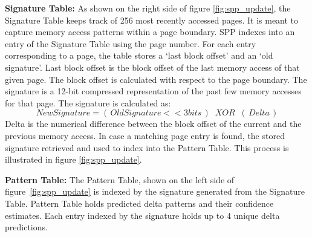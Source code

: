 \noindent \textbf{Signature Table:} As shown on the right side of
figure \ref{fig:spp_update}, the Signature Table keeps track of 256
most recently accessed pages. It is meant to capture memory access
patterns within a page boundary. SPP indexes into an entry of the
Signature Table using the page number. For each entry corresponding to
a page, the table stores a `last block offset' and an `old
signature'. Last block offset is the block offset of the last memory
access of that given page. The block offset is calculated with respect
to the page boundary. The signature is a 12-bit compressed
representation of the past few memory accesses for that page. The
signature is calculated as:
$$New Signature = (\,Old Signature << 3 bits\,) \;\;XOR\;\;
(\,Delta\,)$$ Delta is the numerical difference between the block
offset of the current and the previous memory access. In case a
matching page entry is found, the stored signature retrieved and used
to index into the Pattern Table.  This process is illustrated in
figure \ref{fig:spp_update}.

\noindent \textbf{Pattern Table:} The Pattern Table, shown on the left
side of figure~\ref{fig:spp_update} is indexed by the signature
generated from the Signature Table.  Pattern Table holds predicted
delta patterns and their confidence estimates. Each entry indexed by
the signature holds up to 4 unique delta predictions.



